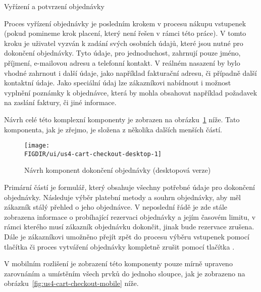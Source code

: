 \begin{subsection}{Vyřízení a potvrzení objednávky}
    \label{subsec:narvh-ui-transformace-uzivatelskych-pribehu-vyrideni-a-potvrzeni-objednavky}
    \userstorycheckout

    Proces vyřízení objednávky je posledním krokem v procesu nákupu vstupenek (pokud pomineme krok placení, který není řešen v rámci této práce).
    V tomto kroku je uživatel vyzván k zadání svých osobních údajů, které jsou nutné pro dokončení objednávky.
    Tyto údaje, pro jednoduchost, zahrnují pouze jméno, příjmení, e-mailovou adresu a telefonní kontakt.
    V reálném nasazení by bylo vhodné zahrnout i další údaje, jako například fakturační adresu, či případně další kontaktní údaje.
    Jako speciální údaj lze zákazníkovi nabídnout i možnost vyplnění poznámky k objednávce, která by mohla obsahovat například požadavek na zaslání faktury, či jiné informace.

    Návrh celé této komplexní komponenty je zobrazen na obrázku~\ref{fig:us4-cart-checkout-desktop} níže.
    Tato komponenta, jak je zřejmo, je složena z několika dalších menších částí.

    \begin{figure}[H]
        \centering
        \texttt{[image: \\FIGDIR/ui/us4-cart-checkout-desktop-1]}
        \caption{Návrh komponent dokončení objednávky (desktopová verze)}
        \label{fig:us4-cart-checkout-desktop}
    \end{figure}

    Primární částí je formulář, který obsahuje všechny potřebné údaje pro dokončení objednávky.
    Následuje výběr platební metody a souhrn objednávky, aby měl zákazník stálý přehled o jeho objednávce.
    V neposlední řádě je zde stále zobrazena informace o probíhající rezervaci objednávky a jejím časovém limitu, v rámci kterého musí zákazník objednávku dokončit, jinak bude rezervace zrušena.
    Dále je zákazníkovi umožněno přejít zpět do procesu výběru vstupenek pomocí tlačítka  či proces vytváření objednávky kompletně zrušit pomocí tlačítka .

    V mobilním rozlišení je zobrazení této komponenty pouze mírně upraveno zarovnáním a umístěním všech prvků do jednoho sloupce, jak je zobrazeno na obrázku~\ref{fig:us4-cart-checkout-mobile} níže.


\end{subsection}

